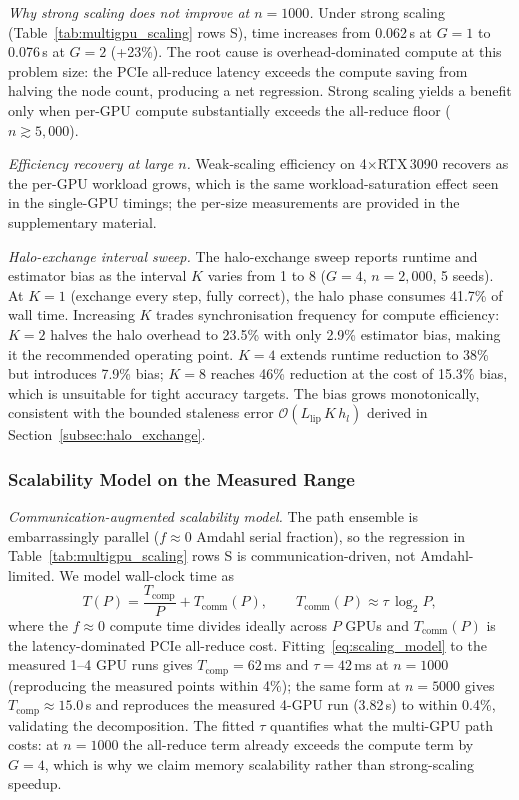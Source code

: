 \documentclass{ieeeaccess}
\begin{document}
\textit{Why strong scaling does not improve at $n{=}1000$.}
Under strong scaling (Table~\ref{tab:multigpu_scaling} rows S), time increases from 0.062\,s
at $G{=}1$ to 0.076\,s at $G{=}2$ (+23\%). The root cause is overhead-dominated compute at
this problem size: the PCIe all-reduce latency exceeds the compute saving from halving the
node count, producing a net regression. Strong scaling yields a benefit only when per-GPU
compute substantially exceeds the all-reduce floor ($n{\gtrsim}5{,}000$).

\textit{Efficiency recovery at large $n$.}
Weak-scaling efficiency on 4$\times$RTX\,3090 recovers as the per-GPU workload grows, which is
the same workload-saturation effect seen in the single-GPU timings; the per-size measurements
are provided in the supplementary material.

\textit{Halo-exchange interval sweep.}
The halo-exchange sweep reports runtime and estimator bias as the
interval $K$ varies from 1 to 8 ($G{=}4$, $n{=}2{,}000$, 5 seeds).  At $K{=}1$
(exchange every step, fully correct), the halo phase consumes 41.7\% of wall time.
Increasing $K$ trades synchronisation frequency for compute efficiency: $K{=}2$ halves
the halo overhead to 23.5\% with only 2.9\% estimator bias, making it the recommended
operating point.  $K{=}4$ extends runtime reduction to 38\% but introduces 7.9\% bias;
$K{=}8$ reaches 46\% reduction at the cost of 15.3\% bias, which is unsuitable for
tight accuracy targets.  The bias grows monotonically, consistent with the bounded staleness
error $\mathcal{O}(L_{\mathrm{lip}}\,K\,h_l)$ derived in Section~\ref{subsec:halo_exchange}.

\subsubsection{Scalability Model on the Measured Range}
\label{subsec:scaling_model}

\emph{Communication-augmented scalability model.}
The path ensemble is embarrassingly parallel ($f{\approx}0$ Amdahl serial fraction), so the
regression in Table~\ref{tab:multigpu_scaling} rows S is communication-driven, not
Amdahl-limited. We model wall-clock time as
\begin{equation}
T(P) = \frac{T_{\mathrm{comp}}}{P} + T_{\mathrm{comm}}(P),
\qquad T_{\mathrm{comm}}(P) \approx \tau\,\log_2 P,
\label{eq:scaling_model}
\end{equation}
where the $f{\approx}0$ compute time divides ideally across $P$ GPUs and $T_{\mathrm{comm}}(P)$
is the latency-dominated PCIe all-reduce cost. Fitting~\eqref{eq:scaling_model} to the measured
1--4 GPU runs gives $T_{\mathrm{comp}}{=}62$\,ms and $\tau{=}42$\,ms at $n{=}1000$ (reproducing
the measured points within 4\%); the same form at $n{=}5000$ gives
$T_{\mathrm{comp}}{\approx}15.0$\,s and reproduces the measured 4-GPU run (3.82\,s) to within
0.4\%, validating the decomposition. The fitted $\tau$ quantifies what the multi-GPU path costs:
at $n{=}1000$ the all-reduce term already exceeds the compute term by $G{=}4$, which is why we
claim memory scalability rather than strong-scaling speedup.
\end{document}
